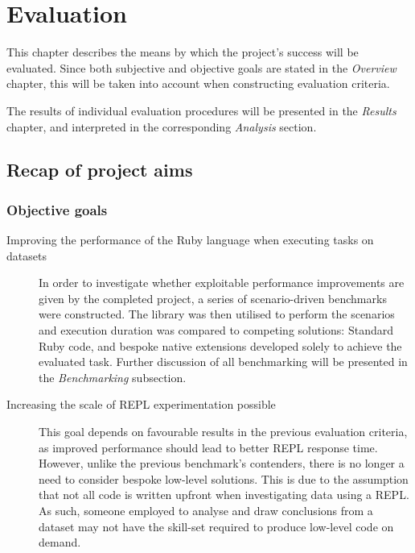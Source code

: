 \chapter{Evaluation}
This chapter describes the means by which the project's success will be evaluated.
Since both subjective and objective goals are stated in the \emph{Overview} chapter, this will be taken into account when constructing evaluation criteria.

The results of individual evaluation procedures will be presented in the \emph{Results} chapter, and interpreted in the corresponding \emph{Analysis} section.

\section{Recap of project aims}
\subsection{Objective goals}
\begin{description}
\item[Improving the performance of the Ruby language when executing tasks on datasets]
In order to investigate whether exploitable performance improvements are given by the completed project, a series of scenario-driven benchmarks were constructed.
The library was then utilised to perform the scenarios and execution duration was compared to competing solutions: Standard Ruby code, and bespoke native extensions developed solely to achieve the evaluated task.
Further discussion of all benchmarking will be presented in the \emph{Benchmarking} subsection.
\item[Increasing the scale of \ac{REPL} experimentation possible]
This goal depends on favourable results in the previous evaluation criteria, as improved performance should lead to better \ac{REPL} response time. However, unlike the previous benchmark's contenders, there is no longer a need to consider bespoke low-level solutions. This is due to the assumption that not all code is written upfront when investigating data using a \ac{REPL}. As such, someone employed to analyse and draw conclusions from a dataset may not have the skill-set required to produce low-level code on demand.
\end{description}

